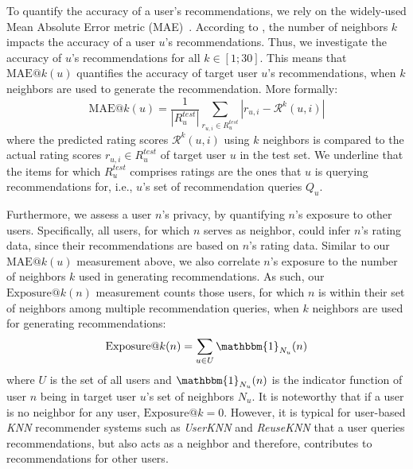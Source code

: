 \documentclass[manuscript,review,anonymous]{acmart}
\begin{document}
To quantify the accuracy of a user's recommendations, we rely on the widely-used Mean Absolute Error metric  (MAE)~\cite{willmott2005advantages}.
According to \cite{herlocker1999algorithmic,herlocker2002empirical}, the number of neighbors $k$ impacts the accuracy of a user $u$'s recommendations.
Thus, we investigate the accuracy of $u$'s recommendations for all $k \in [1; 30]$.
This means that $\mathrm{MAE}@k(u)$ quantifies the accuracy of target user $u$'s recommendations, when $k$ neighbors are used to generate the recommendation.
More formally:  
\begin{equation}
    \mathrm{MAE}@k(u) = \frac{1}{|R^{test}_u|} \sum_{r_{u, i} \in R^{test}_u} |r_{u, i} - \mathcal{R}^k(u, i)| 
\end{equation}
where the predicted rating scores $\mathcal{R}^k(u, i)$ using $k$ neighbors is compared to the actual rating scores $r_{u, i} \in R^{test}_u$ of target user $u$ in the test set.
We underline that the items for which $R^{test}_u$ comprises ratings are the ones that $u$ is querying recommendations for, i.e., $u$'s set of recommendation queries $Q_u$.

Furthermore, we assess a user $n$'s privacy, by quantifying $n$'s exposure to other users.
Specifically, all users, for which $n$ serves as neighbor, could infer $n$'s rating data, since their recommendations are based on $n$'s rating data.
Similar to our $\mathrm{MAE}@k(u)$ measurement above, we also correlate $n$'s exposure to the number of neighbors $k$ used in generating recommendations.
As such, our $\mathrm{Exposure}@k(n)$ measurement counts those users, for which $n$ is within their set of neighbors among multiple recommendation queries, when $k$ neighbors are used for generating recommendations:
\begin{equation}
    \mathrm{Exposure}@k(n) = \sum_{u \in U} \mathbbm{1}_{N_u}(n)
\end{equation}
where $U$ is the set of all users and $\mathbbm{1}_{N_u}(n)$ is the indicator function of user $n$ being in target user $u$'s set of neighbors $N_u$. It is noteworthy that if a user is no neighbor for any user, $\mathrm{Exposure}@k = 0$.
However, it is typical for user-based \emph{KNN} recommender systems such as \emph{UserKNN} and \emph{ReuseKNN} that a user queries recommendations, but also acts as a neighbor and therefore, contributes to recommendations for other users.
\end{document}
